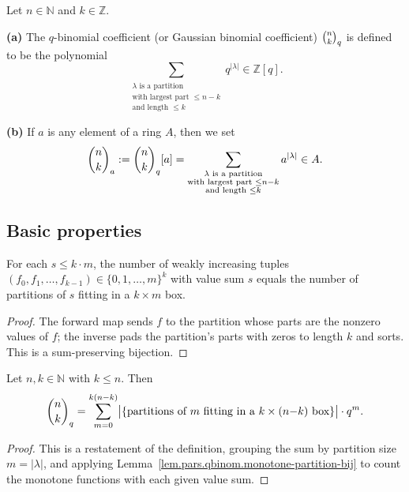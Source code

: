 \begin{definition}
\label{def.pars.qbinom.qbinom}
\leantarget
\leanok
Let $n\in\mathbb{N}$ and $k\in\mathbb{Z}$.

\textbf{(a)} The $q$-binomial coefficient (or Gaussian binomial
coefficient) $\dbinom{n}{k}_{q}$ is defined to be the polynomial
\[
\sum_{\substack{\lambda\text{ is a partition}\\\text{with largest part }\leq
n-k\\\text{and length }\leq k}}q^{|\lambda|}\in\mathbb{Z}[q].
\]

\textbf{(b)} If $a$ is any element of a ring $A$, then we set
\[
\dbinom{n}{k}_{a} := \dbinom{n}{k}_{q}[a]
= \sum_{\substack{\lambda\text{ is a partition}\\\text{with largest part
}\leq n-k\\\text{and length }\leq k}}a^{|\lambda|}\in A.
\]
\end{definition}

\subsection{Basic properties}

\begin{lemma}
\label{lem.pars.qbinom.monotone-partition-bij}
\leanhelper
\leanok
For each $s \le k \cdot m$, the number of weakly increasing tuples
$(f_0, f_1, \ldots, f_{k-1}) \in \{0,1,\ldots,m\}^k$ with value sum $s$
equals the number of partitions of $s$ fitting in a $k \times m$ box.
\end{lemma}

\begin{proof}
The forward map sends $f$ to the partition whose parts are the nonzero values
of $f$; the inverse pads the partition's parts with zeros to length $k$
and sorts. This is a sum-preserving bijection.
\end{proof}

\begin{lemma}
\label{lem.pars.qbinom.partition-gf}
\leanhelper
\leanok
Let $n, k \in \mathbb{N}$ with $k \le n$. Then
\[
\dbinom{n}{k}_{q}
= \sum_{m=0}^{k(n-k)}
  \bigl|\{\text{partitions of } m \text{ fitting in a } k \times (n{-}k) \text{ box}\}\bigr|
  \cdot q^{m}.
\]
\end{lemma}

\begin{proof}
This is a restatement of the definition, grouping the sum by partition size $m = |\lambda|$,
and applying Lemma~\ref{lem.pars.qbinom.monotone-partition-bij} to count the monotone
functions with each given value sum.
\end{proof}

